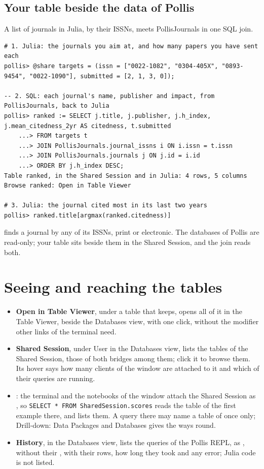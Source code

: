 \subsection{Your table beside the data of Pollis}
A list of journals in Julia, by their ISSNs, meets PollisJournals in one SQL join.
\begin{lstlisting}
# 1. Julia: the journals you aim at, and how many papers you have sent each
pollis> @share targets = (issn = ["0022-1082", "0304-405X", "0893-9454", "0022-1090"], submitted = [2, 1, 3, 0]);

-- 2. SQL: each journal's name, publisher and impact, from PollisJournals, back to Julia
pollis> ranked := SELECT j.title, j.publisher, j.h_index, j.mean_citedness_2yr AS citedness, t.submitted
    ...> FROM targets t
    ...> JOIN PollisJournals.journal_issns i ON i.issn = t.issn
    ...> JOIN PollisJournals.journals j ON j.id = i.id
    ...> ORDER BY j.h_index DESC;
Table ranked, in the Shared Session and in Julia: 4 rows, 5 columns
Browse ranked: Open in Table Viewer

# 3. Julia: the journal cited most in its last two years
pollis> ranked.title[argmax(ranked.citedness)]
\end{lstlisting}
 finds a journal by any of its ISSNs, print or electronic. The databases of Pollis are read-only;
your table sits beside them in the Shared Session, and the join reads both.

\section{Seeing and reaching the tables}\label{sec:seeing}
\begin{itemize}
  \item \textbf{Open in Table Viewer}, under a table that \file{:=} keeps, opens all of it in the Table Viewer, beside
    the Databases view, with one click, without the modifier other links of the terminal need.
  \item \textbf{Shared Session}, under User in the Databases view, lists the tables of the Shared Session, those of
    both bridges among them; click it to browse them. Its hover says how many clients of the window are attached to
    it and which of their queries are running.
  \item \textbf{}: the  terminal and the notebooks of the window attach the
    Shared Session as , so \texttt{\small SELECT * FROM SharedSession.scores} reads the table of
    the first example there, and  lists them. A query there may name a table of 
    once only; Drill-down: Data Packages and Databases gives the ways round.
  \item \textbf{History}, in the Databases view, lists the queries of the Pollis REPL, as , without
    their , with their rows, how long they took and any error; Julia code is not listed.
\end{itemize}

